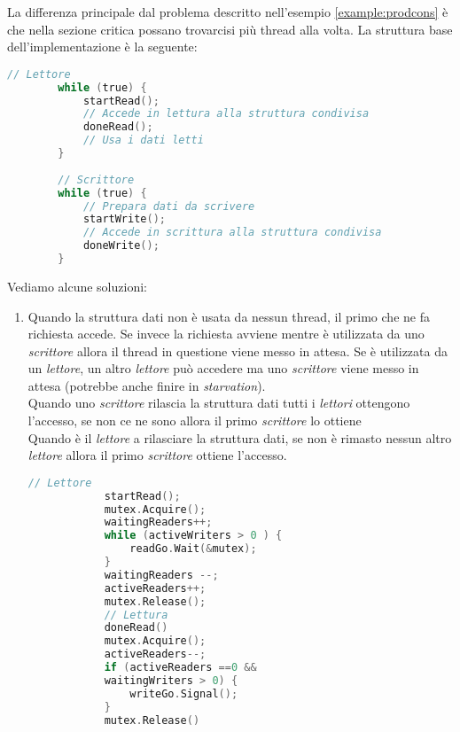 \begin{example}
	La differenza principale dal problema descritto nell'esempio \ref{example:prodcons} è che nella sezione critica possano trovarcisi più thread alla volta. La struttura base dell'implementazione è la seguente:
	\begin{lstlisting}[language=C]
		// Lettore
		while (true) {
			startRead();
			// Accede in lettura alla struttura condivisa
			doneRead();
			// Usa i dati letti
		}
		
		// Scrittore
		while (true) {
			// Prepara dati da scrivere
			startWrite();
			// Accede in scrittura alla struttura condivisa
			doneWrite();
		}
	\end{lstlisting}
	Vediamo alcune soluzioni:
	\begin{enumerate}
		\item Quando la struttura dati non è usata da nessun thread, il primo che ne fa richiesta accede. Se invece la richiesta avviene mentre è utilizzata da uno \textit{scrittore} allora il thread in questione viene messo in attesa. Se è utilizzata da un \textit{lettore}, un altro \textit{lettore} può accedere ma uno \textit{scrittore} viene messo in attesa (potrebbe anche finire in \textit{starvation}).\\
		Quando uno \textit{scrittore} rilascia la struttura dati tutti i \textit{lettori} ottengono l'accesso, se non ce ne sono allora il primo \textit{scrittore} lo ottiene\\
		Quando è il \textit{lettore} a rilasciare la struttura dati, se non è rimasto nessun altro \textit{lettore} allora il primo \textit{scrittore} ottiene l'accesso.
		\begin{lstlisting}[language=C]
			// Lettore
			startRead();
			mutex.Acquire();
			waitingReaders++;
			while (activeWriters > 0 ) {
				readGo.Wait(&mutex);
			}
			waitingReaders --;
			activeReaders++;
			mutex.Release();
			// Lettura
			doneRead()
			mutex.Acquire();
			activeReaders--;
			if (activeReaders ==0 && 
			waitingWriters > 0) {
				writeGo.Signal();
			}
			mutex.Release()
			

\end{lstlisting}
\end{enumerate}
\end{example}
